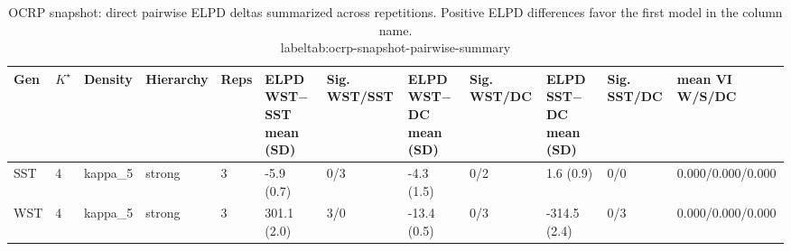 \begin{table}[!h]
\centering
\caption{OCRP snapshot: direct pairwise ELPD deltas summarized across repetitions. Positive ELPD differences favor the first model in the column name.\\label{tab:ocrp-snapshot-pairwise-summary}}
\centering
\begin{tabular}[t]{llllllllllll}
\toprule
Gen & $K^\star$ & Density & Hierarchy & Reps & ELPD WST$-$SST mean (SD) & Sig. WST/SST & ELPD WST$-$DC mean (SD) & Sig. WST/DC & ELPD SST$-$DC mean (SD) & Sig. SST/DC & mean VI W/S/DC\\
\midrule
SST & 4 & kappa_5 & strong & 3 & -5.9 (0.7) & 0/3 & -4.3 (1.5) & 0/2 & 1.6 (0.9) & 0/0 & 0.000/0.000/0.000\\
WST & 4 & kappa_5 & strong & 3 & 301.1 (2.0) & 3/0 & -13.4 (0.5) & 0/3 & -314.5 (2.4) & 0/3 & 0.000/0.000/0.000\\
\bottomrule
\end{tabular}
\end{table}
